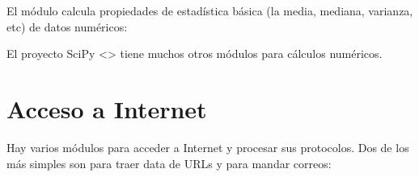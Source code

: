 \documentclass[a5paper,10pt,spanish]{sphinxmanual}
\begin{document}
\sphinxAtStartPar
El módulo  calcula propiedades de estadística básica (la media, mediana, varianza, etc) de datos numéricos:

\begin{sphinxVerbatim}[commandchars=\\\{\}]
 
  \PYG{p}{[}      \PYG{p}{]}
\end{sphinxVerbatim}

\sphinxAtStartPar
El proyecto SciPy <> tiene muchos otros módulos para cálculos numéricos.


\section{Acceso a Internet}
\label{\detokenize{tutorial/stdlib:internet-access}}\label{\detokenize{tutorial/stdlib:tut-internet-access}}
\sphinxAtStartPar
Hay varios módulos para acceder a Internet y procesar sus protocolos.  Dos de los más simples son  para traer data de URLs y  para mandar correos:
\end{document}
